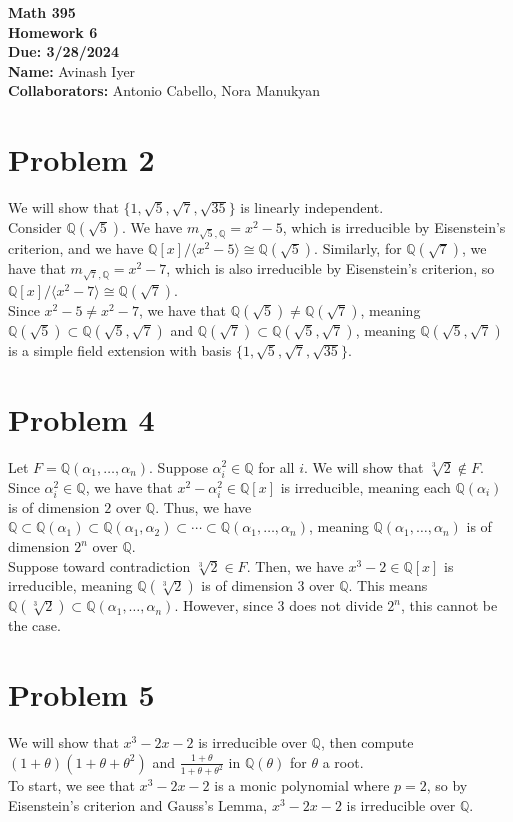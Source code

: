\documentclass[10pt]{extarticle}
\title{}
\author{}
\date{}
\newcommand{\Q}{\mathbb{Q}}
\begin{document}
  \begin{center}
    {\bf \Large Math 395 \\[0.1in]Homework 6 \\[0.1in]
    Due: 3/28/2024}\\[.25in]
    {\bf Name:} {Avinash Iyer}\\[0.15in]
    {\bf Collaborators:} {Antonio Cabello, Nora Manukyan} \\
  \end{center}
  \section{Problem 2}%
  We will show that $\{1,\sqrt{5},\sqrt{7},\sqrt{35}\}$ is linearly independent.\\

  Consider $\Q(\sqrt{5})$. We have $m_{\sqrt{5},\Q} = x^2 - 5$, which is irreducible by Eisenstein's criterion, and we have $\Q[x]/\langle x^2 - 5\rangle \cong \Q(\sqrt{5})$. Similarly, for $\Q(\sqrt{7})$, we have that $m_{\sqrt{7},\Q} = x^2 - 7$, which is also irreducible by Eisenstein's criterion, so $\Q[x]/\langle x^2 - 7 \rangle \cong \Q(\sqrt{7})$.\\

  Since $x^2 - 5 \neq x^2 - 7$, we have that $\Q(\sqrt{5}) \neq \Q(\sqrt{7})$, meaning $\Q(\sqrt{5})\subset \Q(\sqrt{5},\sqrt{7})$ and $\Q(\sqrt{7})\subset \Q(\sqrt{5},\sqrt{7})$, meaning $\Q(\sqrt{5},\sqrt{7})$ is a simple field extension with basis $\{1,\sqrt{5},\sqrt{7},\sqrt{35}\}$.
  \section{Problem 4}%
  Let $F = \Q(\alpha_1,\dots,\alpha_n)$. Suppose $\alpha_i^2\in \Q$ for all $i$. We will show that $\sqrt[3]{2}\notin F$.\\

  Since $\alpha_i^2\in \Q$, we have that $x^2 - \alpha_i^2 \in \Q[x]$ is irreducible, meaning each $\Q(\alpha_i)$ is of dimension $2$ over $\Q$. Thus, we have $\Q\subset \Q(\alpha_1)\subset\Q(\alpha_1,\alpha_2)\subset\cdots\subset \Q(\alpha_1,\dots,\alpha_n)$, meaning $\Q(\alpha_1,\dots,\alpha_n)$ is of dimension $2^n$ over $\Q$.\\

  Suppose toward contradiction $\sqrt[3]{2}\in F$. Then, we have $x^3 - 2\in \Q[x]$ is irreducible, meaning $\Q(\sqrt[3]{2})$ is of dimension $3$ over $\Q$. This means $\Q(\sqrt[3]{2})\subset \Q(\alpha_1,\dots,\alpha_n)$. However, since $3$ does not divide $2^n$, this cannot be the case.
  \section{Problem 5}%
  We will show that $x^3 - 2x - 2$ is irreducible over $\Q$, then compute $(1+\theta)(1+\theta + \theta^2)$ and $\frac{1+\theta}{1+\theta+\theta^2}$ in $\Q(\theta)$ for $\theta$ a root.\\

  To start, we see that $x^3 - 2x - 2$ is a monic polynomial where $p = 2$, so by Eisenstein's criterion and Gauss's Lemma, $x^3 - 2x - 2$ is irreducible over $\Q$.
\end{document}
